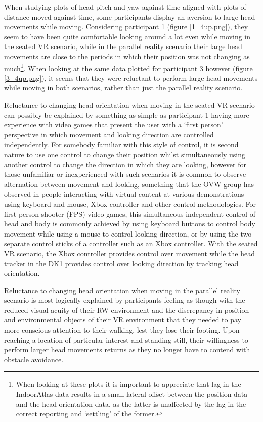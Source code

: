
When studying plots of head pitch and yaw against time aligned with plots of distance moved against time, some participants display an aversion to large head movements while moving. Considering participant 1 (figure \ref{1_4up.png}), they seem to have been quite comfortable looking around a lot even while moving in the seated VR scenario, while in the parallel reality scenario their large head movements are close to the periods in which their position was not changing as much\footnote{When looking at these plots it is important to appreciate that lag in the IndoorAtlas data results in a small lateral offset between the position data and the head orientation data, as the latter is unaffected by the lag in the correct reporting and `settling' of the former.}. When looking at the same data plotted for participant 3 however (figure \ref{3_4up.png}), it seems that they were reluctant to perform large head movements while moving in both scenarios, rather than just the parallel reality scenario.

Reluctance to changing head orientation when moving in the seated VR scenario can possibly be explained by something as simple as participant 1 having more experience with video games that present the user with a `first person' perspective in which movement and looking direction are controlled independently. For somebody familiar with this style of control, it is second nature to use one control to change their position whilst simultaneously using another control to change the direction in which they are looking, however for those unfamiliar or inexperienced with such scenarios it is common to observe alternation between movement and looking, something that the OVW group has observed in people interacting with virtual content at various demonstrations using keyboard and mouse, Xbox controller and other control methodologies. For first person shooter (FPS) video games, this simultaneous independent control of head and body is commonly achieved by using keyboard buttons to control body movement while using a mouse to control looking direction, or by using the two separate control sticks of a controller such as an Xbox controller. With the seated VR scenario, the Xbox controller provides control over movement while the head tracker in the DK1 provides control over looking direction by tracking head orientation.

Reluctance to changing head orientation when moving in the parallel reality scenario is most logically explained by participants feeling as though with the reduced visual acuity of their RW environment and the discrepancy in position and environmental objects of their VR environment that they needed to pay more conscious attention to their walking, lest they lose their footing. Upon reaching a location of particular interest and standing still, their willingness to perform larger head movements returns as they no longer have to contend with obstacle avoidance.

